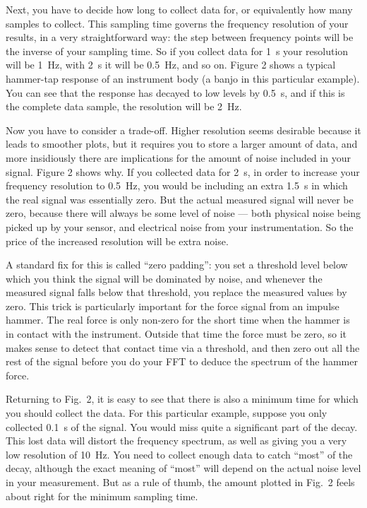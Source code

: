   Next, you have to decide how long to collect data for, or equivalently how 
  many samples to collect. This sampling time governs the frequency resolution 
  of your results, in a very straightforward way: the step between frequency 
  points will be the inverse of your sampling time. So if you collect data for 
  1~s your resolution will be 1~Hz, with 2~s it will be 0.5~Hz, and so on. 
  Figure 2 shows a typical hammer-tap response of an instrument body (a banjo 
  in this particular example). You can see that the response has decayed to low 
  levels by 0.5~s, and if this is the complete data sample, the resolution will 
  be 2~Hz. 


  Now you have to consider a trade-off. Higher resolution seems desirable 
  because it leads to smoother plots, but it requires you to store a larger 
  amount of data, and more insidiously there are implications for the amount of 
  noise included in your signal. Figure 2 shows why. If you collected data for 
  2~s, in order to increase your frequency resolution to 0.5~Hz, you would be 
  including an extra 1.5~s in which the real signal was essentially zero. But 
  the actual measured signal will never be zero, because there will always be 
  some level of noise — both physical noise being picked up by your sensor, and 
  electrical noise from your instrumentation. So the price of the increased 
  resolution will be extra noise. 

  A standard fix for this is called “zero padding”: you set a threshold level 
  below which you think the signal will be dominated by noise, and whenever the 
  measured signal falls below that threshold, you replace the measured values 
  by zero. This trick is particularly important for the force signal from an 
  impulse hammer. The real force is only non-zero for the short time when the 
  hammer is in contact with the instrument. Outside that time the force must be 
  zero, so it makes sense to detect that contact time via a threshold, and then 
  zero out all the rest of the signal before you do your FFT to deduce the 
  spectrum of the hammer force. 

  Returning to Fig.\ 2, it is easy to see that there is also a minimum time for 
  which you should collect the data. For this particular example, suppose you 
  only collected 0.1~s of the signal. You would miss quite a significant part 
  of the decay. This lost data will distort the frequency spectrum, as well as 
  giving you a very low resolution of 10~Hz. You need to collect enough data to 
  catch “most” of the decay, although the exact meaning of “most” will depend 
  on the actual noise level in your measurement. But as a rule of thumb, the 
  amount plotted in Fig.\ 2 feels about right for the minimum sampling time. 

